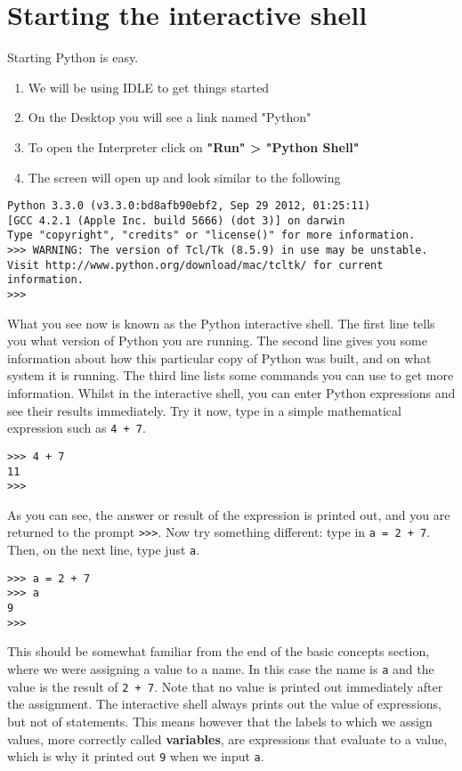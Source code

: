 
\section{Starting the interactive shell}

Starting Python is easy.
\begin{enumerate}
    \item We will be using IDLE to get things started
    \item On the Desktop you will see a link named "Python"
    \item To open the Interpreter click on \textbf{"Run" > "Python Shell"}
    \item The screen will open up and look similar to the following
\end{enumerate}

\begin{lstlisting}
Python 3.3.0 (v3.3.0:bd8afb90ebf2, Sep 29 2012, 01:25:11) 
[GCC 4.2.1 (Apple Inc. build 5666) (dot 3)] on darwin
Type "copyright", "credits" or "license()" for more information.
>>> WARNING: The version of Tcl/Tk (8.5.9) in use may be unstable.
Visit http://www.python.org/download/mac/tcltk/ for current information.
>>>
\end{lstlisting}

What you see now is known as the Python interactive shell. The first   line tells you what version of Python you are running. The second line   gives you some information about how this particular copy of Python was   built, and on what system it is running. The third line lists some   commands you can use to get more information. Whilst in the interactive   shell, you can enter Python expressions and see their results   immediately. Try it now, type in a simple mathematical expression such   as 
\texttt{4 + 7}.
\begin{lstlisting}
>>> 4 + 7
11
>>>
\end{lstlisting}

As you can see, the answer or result of the expression is printed   out, and you are returned to the prompt \texttt{>>>}. Now try   something different: type in 
\texttt{a = 2 + 7}.  Then, on the   next line, type just 
\texttt{a}.
\begin{lstlisting}
>>> a = 2 + 7
>>> a
9
>>>
\end{lstlisting}

This should be somewhat familiar from the end of the basic concepts   section, where we were assigning a value to a name. In this case the   name is \texttt{a} and the value is the result of \texttt{2 + 7}. Note that no value   is printed out immediately after the assignment. The interactive shell   always prints out the value of expressions, but not of statements. This   means however that the labels to which we assign values, more correctly   called \textbf{variables}, are expressions that evaluate to a   value, which is why it printed out 
\texttt{9} when we input \texttt{a}.

